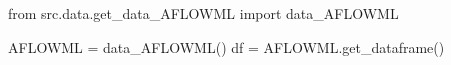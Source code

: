 from src.data.get_data_AFLOWML import data_AFLOWML

AFLOWML = data_AFLOWML()
df = AFLOWML.get_dataframe()
